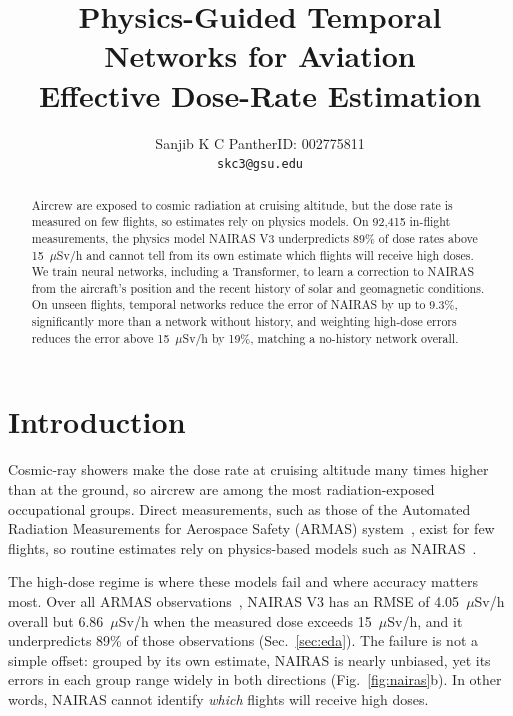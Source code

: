 \documentclass[10pt,twocolumn,letterpaper]{article}
\begin{document}
\title{Physics-Guided Temporal Networks for Aviation\\Effective Dose-Rate Estimation}

\author{Sanjib K C \quad PantherID: 002775811\\
{\tt\small skc3@gsu.edu}
}

\maketitle
\thispagestyle{empty}

\begin{abstract}
Aircrew are exposed to cosmic radiation at cruising altitude, but the dose
rate is measured on few flights, so estimates rely on physics models. On
92,415 in-flight measurements, the physics model NAIRAS V3 underpredicts 89\%
of dose rates above 15~$\mu$Sv/h and cannot tell from its own estimate which
flights will receive high doses. We train neural networks, including a
Transformer, to learn a correction to NAIRAS from the aircraft's position and
the recent history of solar and geomagnetic conditions. On unseen flights,
temporal networks reduce the error of NAIRAS by up to 9.3\%, significantly
more than a network without history, and weighting high-dose errors reduces the
error above 15~$\mu$Sv/h by 19\%, matching a no-history network overall.
\end{abstract}

\section{Introduction}
\label{sec:intro}

Cosmic-ray showers make the dose rate at cruising altitude many times higher
than at the ground, so aircrew are among the most radiation-exposed
occupational groups. Direct measurements, such as those of the Automated
Radiation Measurements for Aerospace Safety (ARMAS) system~\cite{tobiska2016},
exist for few flights, so routine estimates rely on physics-based models such
as NAIRAS~\cite{mertens2013}.

The high-dose regime is where these models fail and where accuracy matters
most. Over all ARMAS observations~\cite{sadykov2026}, NAIRAS V3 has an RMSE of
4.05~$\mu$Sv/h overall but 6.86~$\mu$Sv/h when the measured dose exceeds
15~$\mu$Sv/h, and it underpredicts 89\% of those observations
(Sec.~\ref{sec:eda}). The failure is not a simple offset: grouped by its own
estimate, NAIRAS is nearly unbiased, yet its errors in each group range widely
in both directions (Fig.~\ref{fig:nairas}b). In other words, NAIRAS cannot
identify \emph{which} flights will receive high doses.
\end{document}
